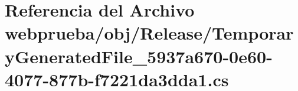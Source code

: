\hypertarget{webprueba_2obj_2_release_2_temporary_generated_file__5937a670-0e60-4077-877b-f7221da3dda1_8cs}{}\section{Referencia del Archivo webprueba/obj/\+Release/\+Temporary\+Generated\+File\+\_\+5937a670-\/0e60-\/4077-\/877b-\/f7221da3dda1.cs}
\label{webprueba_2obj_2_release_2_temporary_generated_file__5937a670-0e60-4077-877b-f7221da3dda1_8cs}
